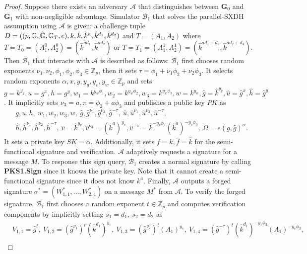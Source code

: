 \documentclass[11pt,letterpaper]{article}
\newcommand{\G}{\mathbb{G}}
\newcommand{\Z}{\mathbb{Z}}
\newcommand{\mc}[1]{\mathcal{#1}}
\newcommand{\tb}[1]{\textbf{#1}}
\newcommand{\lb}{\linebreak[0]}
\begin{document}
\begin{proof}
Suppose there exists an adversary $\mc{A}$ that distinguishes between
$\tb{G}_0$ and $\tb{G}_1$ with non-negligible advantage. Simulator $\mc{B}_1$
that solves the parallel-SXDH assumption using $\mc{A}$ is given: a challenge
tuple
    $D = ((p, \G, \hat{\G}, \G_T, e), \lb
    k, \hat{k}, \hat{k}^a, \hat{k}^{d_1}, \hat{k}^{d_2})$ and
    $T = (A_1, A_2)$ where
    $T = T_0 = (A_1^0, A_2^0) = (\hat{k}^{ad_1}, \hat{k}^{ad_2})$ or
    $T = T_1 = (A_1^1, A_2^1) = (\hat{k}^{ad_1 + d_3}, \hat{k}^{ad_2 + d_4})$.
Then $\mc{B}_1$ that interacts with $\mc{A}$ is described as follows:
$\mc{B}_1$ first chooses random exponents $\nu_1, \nu_2, \phi_1, \phi_2,
\phi_3 \in \Z_p$, then it sets $\tau = \phi_1 + \nu_1 \phi_2 + \nu_2 \phi_3$.
It selects random exponents $\alpha, x, y, y_g, y_v, y_w \in \Z_p$ and sets
    $g = k^{y_g}, u = g^x, h = g^y,
    w_1 = k^{y_w \phi_1}, w_2 = k^{y_w \phi_2}, w_3 = k^{y_w \phi_3}, w = k^{y_w},
    \hat{g} = \hat{k}^{y_g}, \hat{u} = \hat{g}^x, \hat{h} = \hat{g}^y$.
It implicitly sets $\nu_3 = a, \pi = \phi_2 + a \phi_3$ and publishes a
public key $PK$ as
    \begin{align*}
    &   g, u, h,~ w_1, w_2, w_3, w,~
        \hat{g}, \hat{g}^{\nu_1}, \hat{g}^{\nu_2}, \hat{g}^{-\tau},~
        \hat{u}, \hat{u}^{\nu_1}, \hat{u}^{\nu_2}, \hat{u}^{-\tau},~ \\
    &   \hat{h}, \hat{h}^{\nu_1}, \hat{h}^{\nu_2}, \hat{h}^{-\tau},~
        \hat{v} = \hat{k}^{y_v}, \hat{v}^{\nu_3} = (\hat{k}^a)^{y_v},
        \hat{v}^{-\pi} = \hat{k}^{-y_v \phi_2} (\hat{k}^a)^{-y_v \phi_3},~
        \Omega = e(g, \hat{g})^{\alpha}.
    \end{align*}
It sets a private key $SK = \alpha$. Additionally, it sets $f = k, \hat{f} =
\hat{k}$ for the semi-functional signature and verification. $\mc{A}$
adaptively requests a signature for a message $M$. To response this sign
query, $\mc{B}_1$ creates a normal signature by calling \textbf{PKS1.Sign}
since it knows the private key. Note that it cannot create a semi-functional
signature since it does not know $k^a$. Finally, $\mc{A}$ outputs a forged
signature $\sigma^* = (W_{1,1}^*, \ldots, W_{2,4}^*)$ on a message $M^*$ from
$\mc{A}$. To verify the forged signature, $\mc{B}_1$ first chooses a random
exponent $t \in \Z_p$ and computes verification components by implicitly
setting $s_1 = d_1,~ s_2 = d_2$ as
    \begin{align*}
    & V_{1,1} = \hat{g}^t,~
      V_{1,2} = (\hat{g}^{\nu_1})^t (\hat{k}^{d_1})^{y_v},~
      V_{1,3} = (\hat{g}^{\nu_2})^t (A_1)^{y_v},~
      V_{1,4} = (\hat{g}^{-\tau})^t (\hat{k}^{d_1})^{-y_v \phi_2} (A_1)^{-y_v \phi_3}, \\

\end{align*}
\end{proof}
\end{document}
